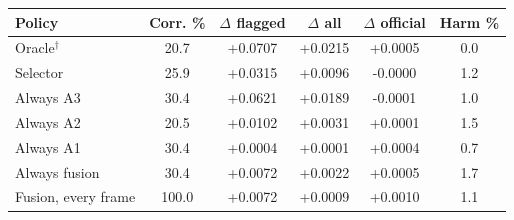 \begin{tabular}{lccccc}
\hline
Policy & Corr. \% & $\Delta$ flagged & $\Delta$ all & $\Delta$ official & Harm \% \\
\hline
Oracle$^{\dagger}$ & 20.7 & +0.0707 & +0.0215 & +0.0005 & 0.0 \\
Selector & 25.9 & +0.0315 & +0.0096 & -0.0000 & 1.2 \\
Always A3 & 30.4 & +0.0621 & +0.0189 & -0.0001 & 1.0 \\
Always A2 & 20.5 & +0.0102 & +0.0031 & +0.0001 & 1.5 \\
Always A1 & 30.4 & +0.0004 & +0.0001 & +0.0004 & 0.7 \\
Always fusion & 30.4 & +0.0072 & +0.0022 & +0.0005 & 1.7 \\
Fusion, every frame & 100.0 & +0.0072 & +0.0009 & +0.0010 & 1.1 \\
\hline
\end{tabular}
